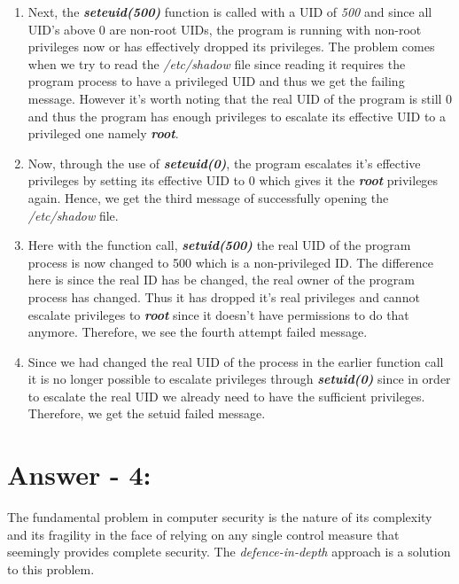 \documentclass[10pt,a4paper,oneside]{article}
\begin{document}
\begin{enumerate}
\begin{enumerate}
\item Next, the \textbf{\textit{seteuid(500)}} function is called with a UID of \textit{500} and since all UID's above 0 are non-root UIDs, the program is running with non-root privileges now or has effectively dropped its privileges. The problem comes when we try to read the \textit{/etc/shadow} file since reading it requires the program process to have a privileged UID and thus we get the failing message. However it's worth noting that the real UID of the program is still 0 and thus the program has enough privileges to escalate its effective UID to a privileged one namely \textbf{\textit{root}}.

\item Now, through the use of \textbf{\textit{seteuid(0)}}, the program escalates it's effective privileges by setting its effective UID to 0 which gives it the \textbf{\textit{root}} privileges again. Hence, we get the third message of successfully opening the \textit{/etc/shadow} file.

\item Here with the function call, \textbf{\textit{setuid(500)}} the real UID of the program process is now changed to 500 which is a non-privileged ID. The difference here is since the real ID has be changed, the real owner of the program process has changed. Thus it has dropped it's real privileges and cannot escalate privileges to \textbf{\textit{root}} since it doesn't have permissions to do that anymore. Therefore, we see the fourth attempt failed message.

\item Since we had changed the real UID of the process in the earlier function call it is no longer possible to escalate privileges through \textbf{\textit{setuid(0)}} since in order to escalate the real UID we already need to have the sufficient privileges. Therefore, we get the setuid failed message.
\end{enumerate}

\end{enumerate}

\section*{Answer - 4:}

The fundamental problem in computer security is the nature of its complexity and its fragility in the face of relying on any single control measure that seemingly provides complete security. The \textit{defence-in-depth} approach is a solution to this problem. 
\end{document}
